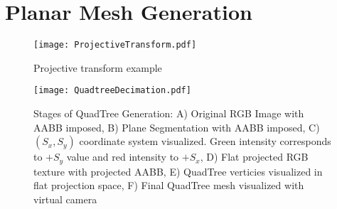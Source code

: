 \section{Planar Mesh Generation}
\begin{figure}[ht]
    \centering
    \texttt{[image: ProjectiveTransform.pdf]}
    \caption{Projective transform example}
    \label{fig:projectivetransform}
\end{figure}

\begin{figure}[ht]
    \centering
    \texttt{[image: QuadtreeDecimation.pdf]}
    \caption{Stages of QuadTree Generation: A) Original RGB Image with AABB imposed, B) Plane Segmentation with AABB imposed, C) $(S_x,S_y)$ coordinate system visualized. Green intensity corresponds to $+S_y$ value and red intensity to $+S_x$, D) Flat projected RGB texture with projected AABB, E) QuadTree verticies visualized in flat projection space, F) Final QuadTree mesh visualized with virtual camera}
    \label{fig:quadtreestages}
\end{figure}


